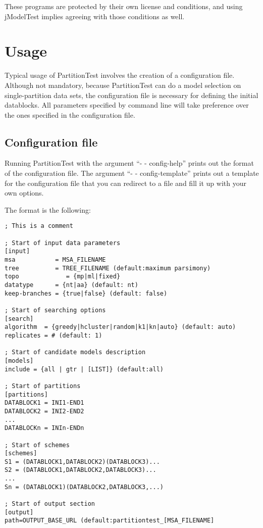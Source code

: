 \documentclass[11pt,twoside,a4paper]{article}
\begin{document}
These programs are protected by their own license and conditions, and using jModelTest implies agreeing with those conditions as well. 


\section{Usage}

Typical usage of PartitionTest involves the creation of a configuration file.
Although not mandatory, because PartitionTest can do a model selection on single-partition
data sets, the configuration file is necessary for defining the initial datablocks.
All parameters specified by command line will take preference over the ones specified in
the configuration file.

\subsection{Configuration file}

Running PartitionTest with the argument ``- - config-help'' prints out the format of the
configuration file. The argument ``- - config-template'' prints out a template for the
configuration file that you can redirect to a file and fill it up with your own options.

The format is the following:

\begin{verbatim}
; This is a comment

; Start of input data parameters
[input]
msa           = MSA_FILENAME
tree          = TREE_FILENAME (default:maximum parsimony)
topo	         = {mp|ml|fixed}
datatype      = {nt|aa} (default: nt)
keep-branches = {true|false} (default: false)

; Start of searching options
[search]
algorithm  = {greedy|hcluster|random|k1|kn|auto} (default: auto)
replicates = # (default: 1)

; Start of candidate models description
[models]
include = {all | gtr | [LIST]} (default:all)

; Start of partitions
[partitions]
DATABLOCK1 = INI1-END1
DATABLOCK2 = INI2-END2
...
DATABLOCKn = INIn-ENDn

; Start of schemes
[schemes]
S1 = (DATABLOCK1,DATABLOCK2)(DATABLOCK3)...
S2 = (DATABLOCK1,DATABLOCK2,DATABLOCK3)...
...
Sn = (DATABLOCK1)(DATABLOCK2,DATABLOCK3,...)

; Start of output section
[output]
path=OUTPUT_BASE_URL (default:partitiontest_[MSA_FILENAME]
\end{verbatim}
\end{document}
